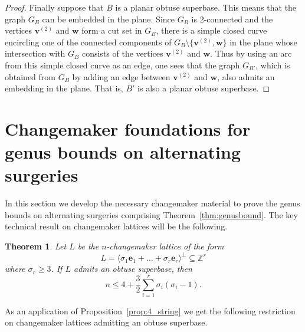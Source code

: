 \documentclass{amsart} %
\newcommand{\Z}{\mathbb{Z}}
\newcommand{\e}{\bm{e}}
\newcommand{\bv}{\bm{v}}
\theoremstyle{thm}
\newtheorem{thm}[Theorem]{Theorem}
\theoremstyle{definition}
\numberwithin{equation}{section}
\begin{document}
\begin{proof}
     Finally suppose that $B$ is a planar obtuse superbase. This means that the graph $G_B$ can be embedded in the plane. Since $G_B$ is 2-connected and the vertices $\bv^{(2)}$ and $\bm{w}$ form a cut set in $G_B$, there is a simple closed curve encircling one of the connected components of $G_B\setminus\{\bv^{(2)}, \bm{w}\}$ in the plane whose intersection with $G_B$ consists of the vertices $\bv^{(2)}$ and $\bm{w}$. Thus by using an arc from this simple closed curve as an edge, one sees that the graph $G_{B'}$, which is obtained from $G_B$ by adding an edge between $\bv^{(2)}$ and $\bm{w}$, also admits an embedding in the plane. That is, $B'$ is also a planar obtuse superbase.
\end{proof}

\section{Changemaker foundations for genus bounds on alternating surgeries}
In this section we develop the necessary changemaker material to prove the genus bounds on alternating surgeries comprising Theorem~\ref{thm:genusbound}. The key technical result on changemaker lattices will be the following.
\begin{thm}\label{thm:2s_to_3_or_bigger}
Let $L$ be the $n$-changemaker lattice of the form
\[
L=\langle \sigma_1 \e_1+ \dots+ \sigma_r \e_r\rangle^\bot\subseteq \Z^r
\]
where $\sigma_r\geq 3$. If $L$ admits an obtuse superbase, then
\begin{equation}\label{eq:n_genus_bound}
n\leq 4 + \frac32\sum_{i=1}^r \sigma_i(\sigma_i-1).
\end{equation}
\end{thm}
As an application of Proposition~\ref{prop:4_string} we get the following restriction on changemaker lattices admitting an obtuse superbase.
\end{document}
